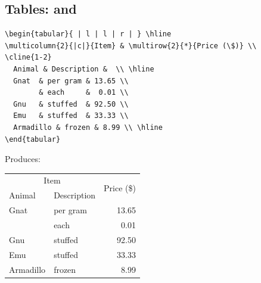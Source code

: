 \documentclass[usenames,dvipsnames]{beamer}
\begin{document}
\subsection{Tables:  and }
\begin{frame}[fragile]{\insertsubsection}
\begin{itemize}


\begin{exampletwouptinynoframe}
{\color{OliveGreen}\begin{Verbatim}[fontsize=\scriptsize]
\begin{tabular}{ | l | l | r | } \hline
\multicolumn{2}{|c|}{Item} & \multirow{2}{*}{Price (\$)} \\ 
\cline{1-2}
  Animal & Description &  \\ \hline
  Gnat  & per gram & 13.65 \\
        & each     &  0.01 \\
  Gnu   & stuffed  & 92.50 \\
  Emu   & stuffed  & 33.33 \\
  Armadillo & frozen & 8.99 \\ \hline
\end{tabular}
\end{Verbatim}}
\end{exampletwouptinynoframe}

\medskip

Produces:
\bigskip

\begin{exampletwouptinynoframe}
{\color{Blue}\begin{tabular}{ | l | l | r | } \hline
  \multicolumn{2}{|c|}{Item} & \multirow{2}{*}{Price (\$)}\\ \cline{1-2}
  Animal & Description &  \\ \hline
  Gnat  & per gram & 13.65 \\
        & each     &  0.01 \\
  Gnu   & stuffed  & 92.50 \\
  Emu   & stuffed  & 33.33 \\
  Armadillo & frozen & 8.99 \\ \hline
  \end{tabular}}
\end{exampletwouptinynoframe}

\end{itemize}
\end{frame}
\end{document}
